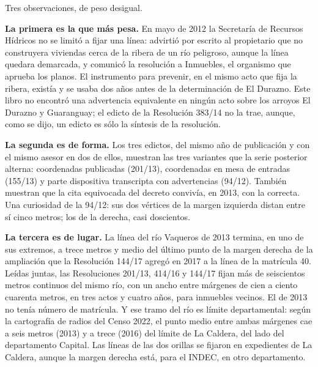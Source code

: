 \begin{cautela}
Tres observaciones, de peso desigual.

\textbf{La primera es la que más pesa.} En mayo de 2012 la Secretaría de Recursos Hídricos no se limitó a fijar una línea: advirtió por escrito al propietario que no construyera viviendas cerca de la ribera de un río peligroso, aunque la línea quedara demarcada, y comunicó la resolución a Inmuebles, el organismo que aprueba los planos. El instrumento para prevenir, en el mismo acto que fija la ribera, existía y se usaba dos años antes de la determinación de El Durazno. Este libro no encontró una advertencia equivalente en ningún acto sobre los arroyos El Durazno y Guaranguay; el edicto de la Resolución 383/14 no la trae, aunque, como se dijo, un edicto es sólo la síntesis de la resolución.

\textbf{La segunda es de forma.} Los tres edictos, del mismo año de publicación y con el mismo asesor en dos de ellos, muestran las tres variantes que la serie posterior alterna: coordenadas publicadas (201/13), coordenadas en mesa de entradas (155/13) y parte dispositiva transcripta con advertencias (94/12). También muestran que la cita equivocada del decreto convivía, en 2013, con la correcta. Una curiosidad de la 94/12: sus dos vértices de la margen izquierda distan entre sí cinco metros; los de la derecha, casi doscientos.

\textbf{La tercera es de lugar.} La línea del río Vaqueros de 2013 termina, en uno de sus extremos, a trece metros y medio del último punto de la margen derecha de la ampliación que la Resolución 144/17 agregó en 2017 a la línea de la matrícula 40. Leídas juntas, las Resoluciones 201/13, 414/16 y 144/17 fijan más de seiscientos metros continuos del mismo río, con un ancho entre márgenes de cien a ciento cuarenta metros, en tres actos y cuatro años, para inmuebles vecinos. El de 2013 no tenía número de matrícula. Y ese tramo del río es límite departamental: según la cartografía de radios del Censo 2022, el punto medio entre ambas márgenes cae a seis metros (2013) y a trece (2016) del límite de La Caldera, del lado del departamento Capital. Las líneas de las dos orillas se fijaron en expedientes de La Caldera, aunque la margen derecha está, para el INDEC, en otro departamento. 
\end{cautela}

